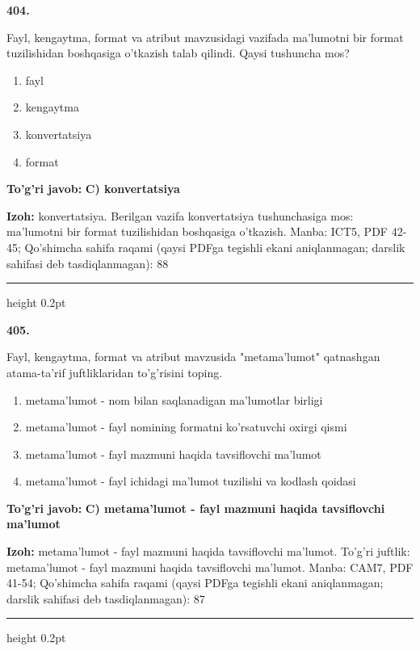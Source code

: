 \documentclass[10pt,a4paper]{article}
\begin{document}
{\bfseries\sffamily\color{ink} 404.}
\par
Fayl, kengaytma, format va atribut mavzusidagi vazifada ma'lumotni bir format tuzilishidan boshqasiga o'tkazish talab qilindi. Qaysi tushuncha mos?
\begin{enumerate}[label=\Alph*),leftmargin=9mm]
\item fayl
\item kengaytma
\item konvertatsiya
\item format
\end{enumerate}
\begin{tcolorbox}[enhanced,breakable,colback=teal!4,colframe=teal!60!black,boxrule=0.45pt,arc=1.2mm,left=2.7mm,right=2.7mm,top=1.8mm,bottom=1.8mm,before skip=2mm,after skip=2mm]
{\bfseries\sffamily\color{teal}To'g'ri javob:} \textbf{C) konvertatsiya}
\par\smallskip
{\bfseries Izoh:} konvertatsiya. Berilgan vazifa konvertatsiya tushunchasiga mos: ma'lumotni bir format tuzilishidan boshqasiga o'tkazish. Manba: ICT5, PDF 42-45; Qo'shimcha sahifa raqami (qaysi PDFga tegishli ekani aniqlanmagan; darslik sahifasi deb tasdiqlanmagan): 88
\end{tcolorbox}
\vspace{2mm}\hrule height 0.2pt\vspace{3mm}

{\bfseries\sffamily\color{ink} 405.}
\par
Fayl, kengaytma, format va atribut mavzusida "metama'lumot" qatnashgan atama-ta'rif juftliklaridan to'g'risini toping.
\begin{enumerate}[label=\Alph*),leftmargin=9mm]
\item metama'lumot - nom bilan saqlanadigan ma'lumotlar birligi
\item metama'lumot - fayl nomining formatni ko'rsatuvchi oxirgi qismi
\item metama'lumot - fayl mazmuni haqida tavsiflovchi ma'lumot
\item metama'lumot - fayl ichidagi ma'lumot tuzilishi va kodlash qoidasi
\end{enumerate}
\begin{tcolorbox}[enhanced,breakable,colback=teal!4,colframe=teal!60!black,boxrule=0.45pt,arc=1.2mm,left=2.7mm,right=2.7mm,top=1.8mm,bottom=1.8mm,before skip=2mm,after skip=2mm]
{\bfseries\sffamily\color{teal}To'g'ri javob:} \textbf{C) metama'lumot - fayl mazmuni haqida tavsiflovchi ma'lumot}
\par\smallskip
{\bfseries Izoh:} metama'lumot - fayl mazmuni haqida tavsiflovchi ma'lumot. To'g'ri juftlik: metama'lumot - fayl mazmuni haqida tavsiflovchi ma'lumot. Manba: CAM7, PDF 41-54; Qo'shimcha sahifa raqami (qaysi PDFga tegishli ekani aniqlanmagan; darslik sahifasi deb tasdiqlanmagan): 87
\end{tcolorbox}
\vspace{2mm}\hrule height 0.2pt\vspace{3mm}
\end{document}
